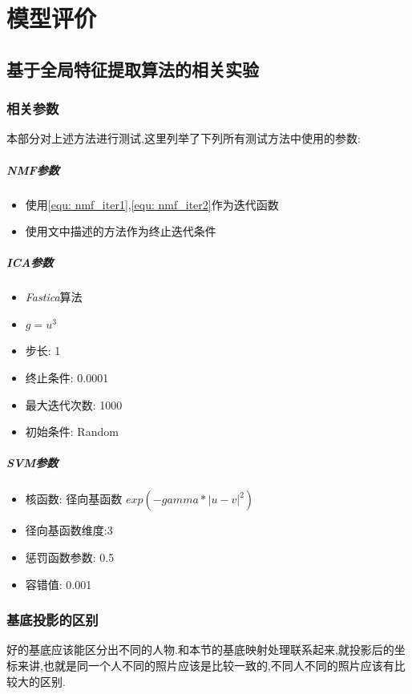 \chapter{模型评价}

\section{基于全局特征提取算法的相关实验}
\label{sec:comp_global}
\subsection{相关参数}
本部分对上述方法进行测试,这里列举了下列所有测试方法中使用的参数:
	\paragraph{NMF参数}
	\begin{itemize}
		\item 使用\ref{equ: nmf_iter1},\ref{equ: nmf_iter2}作为迭代函数
		\item 使用文中描述的方法作为终止迭代条件
	\end{itemize}
	
	\paragraph{ICA参数}
	\begin{itemize}
		\item \textit{Fastica}算法
		\item $g = u^3$
		\item 步长: 1
		\item 终止条件: 0.0001
		\item 最大迭代次数: 1000
		\item 初始条件: Random
	\end{itemize}

	
	\paragraph{SVM参数}
	\begin{itemize}
		\item 核函数: 径向基函数 $exp(-gamma*|u-v|^2)$
		\item 径向基函数维度:3
		\item 惩罚函数参数: 0.5
		\item 容错值: 0.001
	\end{itemize}
	
\subsection{基底投影的区别}
\label{sec:pnibase}
好的基底应该能区分出不同的人物.和本节的基底映射处理联系起来,就投影后的坐标来讲,也就是同一个人不同的照片应该是比较一致的,不同人不同的照片应该有比较大的区别.\newline

